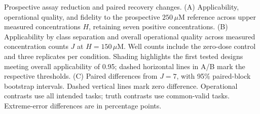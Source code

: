Prospective assay reduction and paired recovery changes. (A) Applicability, operational quality, and fidelity to the prospective \(250\,\mu\mathrm{M}\) reference across upper measured concentrations \(H\), retaining seven positive concentrations. (B) Applicability by class separation and overall operational quality across measured concentration counts \(J\) at \(H=150\,\mu\mathrm{M}\). Well counts include the zero-dose control and three replicates per condition. Shading highlights the first tested designs meeting overall applicability of 0.95; dashed horizontal lines in A/B mark the respective thresholds. (C) Paired differences from \(J=7\), with 95\% paired-block bootstrap intervals. Dashed vertical lines mark zero difference. Operational contrasts use all intended tasks; truth contrasts use common-valid tasks. Extreme-error differences are in percentage points.
